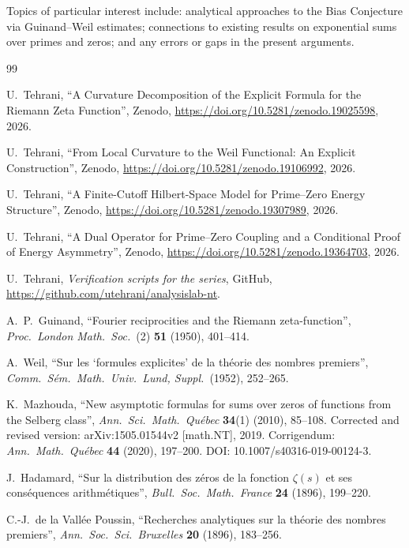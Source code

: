 \documentclass[11pt]{article}
\begin{document}
Topics of particular interest include: analytical approaches to the
Bias Conjecture via Guinand--Weil estimates; connections to existing
results on exponential sums over primes and zeros; and any errors or
gaps in the present arguments.

\newpage
\begin{thebibliography}{99}

U.~Tehrani,
``A Curvature Decomposition of the Explicit Formula
for the Riemann Zeta Function'',
Zenodo, \url{https://doi.org/10.5281/zenodo.19025598}, 2026.

U.~Tehrani,
``From Local Curvature to the Weil Functional:
An Explicit Construction'',
Zenodo, \url{https://doi.org/10.5281/zenodo.19106992}, 2026.

U.~Tehrani,
``A Finite-Cutoff Hilbert-Space Model
for Prime--Zero Energy Structure'',
Zenodo, \url{https://doi.org/10.5281/zenodo.19307989}, 2026.

U.~Tehrani,
``A Dual Operator for Prime--Zero Coupling
and a Conditional Proof of Energy Asymmetry'',
Zenodo, \url{https://doi.org/10.5281/zenodo.19364703}, 2026.

U.~Tehrani,
\emph{Verification scripts for the series},
GitHub, \url{https://github.com/utehrani/analysislab-nt}.

A.~P.~Guinand,
``Fourier reciprocities and the Riemann zeta-function'',
\emph{Proc.\ London Math.\ Soc.}\ (2) \textbf{51} (1950), 401--414.

A.~Weil,
``Sur les `formules explicites' de la th\'eorie des nombres premiers'',
\emph{Comm.\ S\'em.\ Math.\ Univ.\ Lund, Suppl.}\ (1952), 252--265.

K.~Mazhouda,
``New asymptotic formulas for sums over zeros of functions
from the Selberg class'',
\emph{Ann.\ Sci.\ Math.\ Qu\'ebec} \textbf{34}(1) (2010), 85--108.
Corrected and revised version: arXiv:1505.01544v2 [math.NT], 2019.
Corrigendum: \emph{Ann.\ Math.\ Qu\'ebec}
\textbf{44} (2020), 197--200.
DOI: 10.1007/s40316-019-00124-3.

J.~Hadamard,
``Sur la distribution des z\'eros de la fonction $\zeta(s)$
et ses cons\'equences arithm\'etiques'',
\emph{Bull.\ Soc.\ Math.\ France} \textbf{24} (1896), 199--220.

C.-J.~de la Vall\'ee Poussin,
``Recherches analytiques sur la th\'eorie des nombres premiers'',
\emph{Ann.\ Soc.\ Sci.\ Bruxelles} \textbf{20} (1896), 183--256.


\end{thebibliography}
\end{document}
